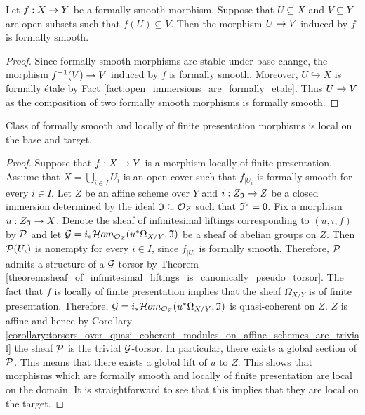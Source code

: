 \begin{proposition}
Let $f:X\rightarrow Y$ be a formally smooth morphism. Suppose that $U\subseteq X$ and $V\subseteq Y$ are open subsets such that $f(U)\subseteq V$. Then the morphism $U\rightarrow V$ induced by $f$ is formally smooth.
\end{proposition}
\begin{proof}
Since formally smooth morphisms are stable under base change, the morphism $f^{-1}(V)\rightarrow V$ induced by $f$ is formally smooth. Moreover, $U \hookrightarrow X $ is formally {\'e}tale by Fact \ref{fact:open_immersions_are_formally_etale}. Thus $U\rightarrow V$ as the composition of two formally smooth morphisms is formally smooth.
\end{proof}

\begin{proposition}\label{proposition:formally_smooth_morphisms_are_local_on_base_and_target}
Class of formally smooth and locally of finite presentation morphisms is local on the base and target. 
\end{proposition}
\begin{proof}
Suppose that $f:X\rightarrow Y$ is a morphism locally of finite presentation. Assume that $X = \bigcup_{i\in I}U_i$ is an open cover such that $f_{\mid U_i}$ is formally smooth for every $i\in I$. Let $Z$ be an affine scheme over $Y$ and $i:Z_{\mathfrak{I}}\rightarrow Z$ be a closed immersion determined by the ideal $\mathfrak{I}\subseteq {\mathcal O}_Z$ such that $\mathfrak{I}^2=0$. Fix a morphism $u:Z_{\mathfrak{I}}\rightarrow X$. Denote the sheaf of infinitesimal liftings corresponding to $(u,i,f)$ by ${\mathcal P}$ and let ${\mathcal G}=i_*{\mathcal H}om_{{\mathcal O}_Z}(u^*\Omega_{X/Y},\mathfrak{I})$ be a sheaf of abelian groups on $Z$. Then ${\mathcal P}(U_i)$ is nonempty for every $i\in I$, since $f_{\mid U_i}$ is formally smooth. Therefore, ${\mathcal P}$ admits a structure of a ${\mathcal G}$-torsor by Theorem \ref{theorem:sheaf_of_infinitesimal_liftings_is_canonically_pseudo_torsor}. The fact that $f$ is locally of finite presentation implies that the sheaf $\Omega_{X/Y}$ is of finite presentation. Therefore, ${\mathcal G} = i_*{\mathcal H}om_{{\mathcal O}_Z}(u^*\Omega_{X/Y},\mathfrak{I})$ is quasi-coherent on $Z$. $Z$ is affine and hence by Corollary \ref{corollary:torsors_over_quasi_coherent_modules_on_affine_schemes_are_trivial} the sheaf ${\mathcal P}$ is the trivial ${\mathcal G}$-torsor. In particular, there exists a global section of ${\mathcal P}$. This means that there exists a global lift of $u$ to $Z$. This shows that morphisms which are formally smooth and locally of finite presentation are local on the domain. It is straightforward to see that this implies that they are local on the target.
\end{proof}

